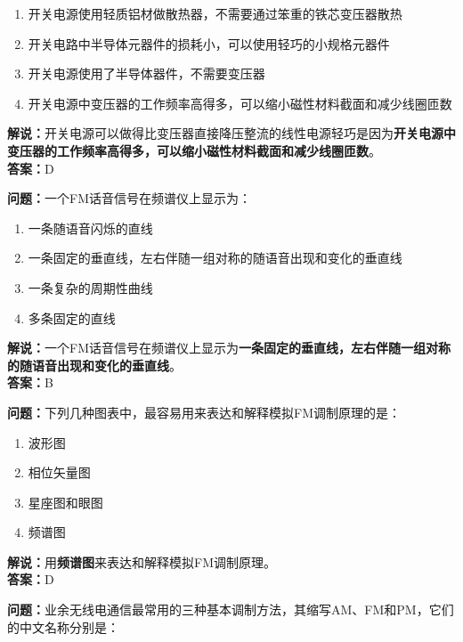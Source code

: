 \documentclass{ctexbook}
\begin{document}
\begin{enumerate}[label=\Alph*), leftmargin=3em]
	\item 开关电源使用轻质铝材做散热器，不需要通过笨重的铁芯变压器散热
	\item 开关电路中半导体元器件的损耗小，可以使用轻巧的小规格元器件
	\item 开关电源使用了半导体器件，不需要变压器
	\item 开关电源中变压器的工作频率高得多，可以缩小磁性材料截面和减少线圈匝数
\end{enumerate}

\noindent\textbf{解说：}开关电源可以做得比变压器直接降压整流的线性电源轻巧是因为\textbf{开关电源中变压器的工作频率高得多，可以缩小磁性材料截面和减少线圈匝数}。\\\noindent\textbf{答案：}D%


\bigskip


\noindent\textbf{问题：}一个FM话音信号在频谱仪上显示为：

\begin{enumerate}[label=\Alph*), leftmargin=3em]
	\item 一条随语音闪烁的直线
	\item 一条固定的垂直线，左右伴随一组对称的随语音出现和变化的垂直线
	\item 一条复杂的周期性曲线
	\item 多条固定的直线
\end{enumerate}

\noindent\textbf{解说：}一个FM话音信号在频谱仪上显示为\textbf{一条固定的垂直线，左右伴随一组对称的随语音出现和变化的垂直线}。\\\noindent\textbf{答案：}B%


\bigskip


\noindent\textbf{问题：}下列几种图表中，最容易用来表达和解释模拟FM调制原理的是：

\begin{enumerate}[label=\Alph*), leftmargin=3em]
	\item 波形图
	\item 相位矢量图
	\item 星座图和眼图
	\item 频谱图
\end{enumerate}

\noindent\textbf{解说：}用\textbf{频谱图}来表达和解释模拟FM调制原理。\\\noindent\textbf{答案：}D%


\bigskip


\noindent\textbf{问题：}业余无线电通信最常用的三种基本调制方法，其缩写AM、FM和PM，它们的中文名称分别是：
\end{document}
